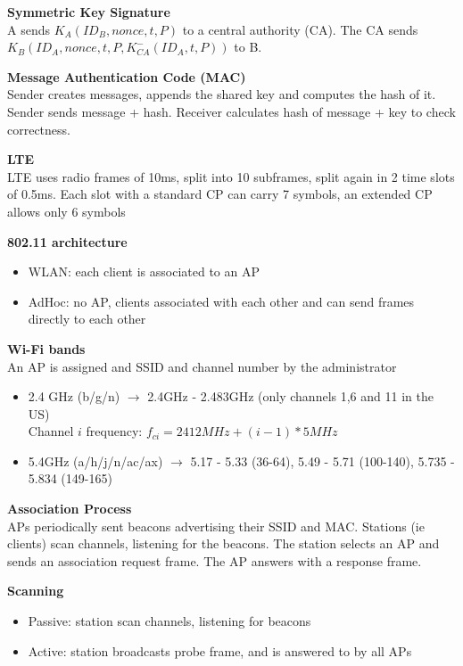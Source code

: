 \documentclass[10pt,letterpaper,landscape]{report}
\newcommand{\boxheight}{21.59cm}
\newcommand{\boxwidth}{8.85cm}
\begin{document}
\begin{small}
{\begin{minipage}[t][\boxheight][c]{\boxwidth}
    \textbf{Symmetric Key Signature}\\
    A sends $K_A(ID_B, nonce, t, P)$ to a central authority (CA). The CA sends $K_B(ID_A, nonce, t, P, K^-_{CA}(ID_A, t, P))$ to B.
    
    \textbf{Message Authentication Code (MAC)} \\
    Sender creates messages, appends the shared key and computes the hash of it. Sender sends message + hash. Receiver calculates hash of message + key to check correctness.
    
    \textbf{LTE} \\
    LTE uses radio frames of 10ms, split into 10 subframes, split again in 2 time slots of 0.5ms. Each slot with a standard CP can carry 7 symbols, an extended CP allows only 6 symbols 
    
    \textbf{802.11 architecture}
    \begin{itemize}
        \item WLAN: each client is associated to an AP
        \item AdHoc: no AP, clients associated with each other and can send frames directly to each other 
    \end{itemize}
    
    \textbf{Wi-Fi bands}\\
    An AP is assigned and SSID and channel number by the administrator
    \begin{itemize}
        \item 2.4 GHz (b/g/n) $\rightarrow$ 2.4GHz - 2.483GHz (only channels 1,6 and 11 in the US)\\ Channel $i$ frequency: $f_{ci} = 2412 MHz + (i-1) * 5 MHz$
        \item 5.4GHz (a/h/j/n/ac/ax) $\rightarrow$ 5.17 - 5.33 (36-64), 5.49 - 5.71 (100-140), 5.735 - 5.834 (149-165)
    \end{itemize}
    
    \textbf{Association Process}\\
    APs periodically sent beacons advertising their SSID and MAC. Stations (ie clients) scan channels, listening for the beacons. The station selects an AP and sends an association request frame. The AP answers with a response frame. 
    
    \textbf{Scanning}
    \begin{itemize}
        \item Passive: station scan channels, listening for beacons
        \item Active: station broadcasts probe frame, and is answered to by all APs 
    \end{itemize}
    

\end{minipage}}
\end{small}
\end{document}
